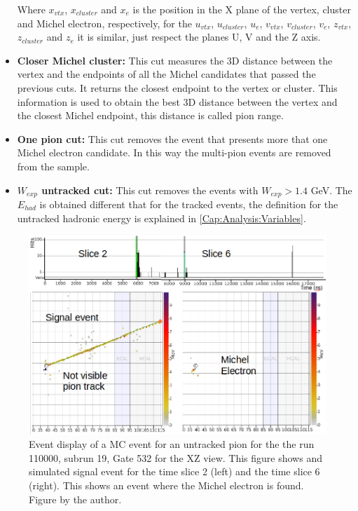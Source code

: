 \begin{itemize}
    Where $x_{vtx}$, $x_{cluster}$ and $x_{e}$ is the position in the X plane of the vertex, cluster and Michel electron, respectively, for the $u_{vtx}$, $u_{cluster}$, $u_{e}$, $v_{vtx}$, $v_{cluster}$, $v_{e}$, $z_{vtx}$, $z_{cluster}$ and $z_{e}$ it is similar, just respect the planes U, V and the Z axis.

    
    \item \textbf{Closer Michel cluster:} This cut measures the 3D distance between the vertex and the endpoints of all the Michel candidates that passed the previous cuts. It returns the closest endpoint to the vertex or cluster. This information is used to obtain the best 3D distance between the vertex and the closest Michel endpoint, this distance is called pion range. 
    \item \textbf{One pion cut:} This cut removes the event that presents more that one Michel electron candidate. In this way the multi-pion events are removed from the sample.
    \item \textbf{$W_{exp}$ untracked cut:} This cut removes the events with $W_{exp} > 1.4$ GeV. The $E_{had}$ is obtained different that for the tracked events, the definition for the untracked hadronic energy is explained in \ref{Cap:Analysis:Variables}.

\end{itemize}

\begin{figure}[!htb]
    \centering
    \includegraphics[scale=0.4]{Figures/Chapter4/DataSelection/EvenDisplayUntrackedSignalEventRun110000SubRun19Gate532.png}
    \caption{Event display of a MC event for an untracked pion for the the run 110000, subrun 19, Gate 532 for the XZ view. This figure shows and simulated signal event for the time slice 2 (left) and the time slice 6 (right). This shows an event where the Michel electron is found. Figure by the author.}
    \label{fig:Analysis:DataSelection:Cuts:Tracked:EventDisplayMEUntracked}
\end{figure}

